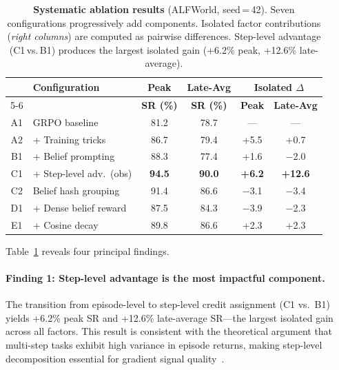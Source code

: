 \begin{table}[t]
  \centering
  \caption{%
    \textbf{Systematic ablation results} (ALFWorld, seed\,=\,42).
    Seven configurations progressively add components.
    Isolated factor contributions (\textit{right columns}) are computed as pairwise
    differences.
    Step-level advantage (C1\,vs.\,B1) produces the largest isolated gain
    (+6.2\% peak, +12.6\% late-average).
  }
  \label{tab:ablation}
  \vspace{4pt}
  \small
  \renewcommand{\arraystretch}{1.15}
  \begin{tabular}{@{}cl cc cc@{}}
    \toprule
    & \textbf{Configuration}
      & \textbf{Peak} & \textbf{Late-Avg}
      & \multicolumn{2}{c}{\textbf{Isolated $\Delta$}} \\
    \cmidrule(lr){5-6}
    & & \textbf{SR (\%)} & \textbf{SR (\%)}
      & \textbf{Peak} & \textbf{Late-Avg} \\
    \midrule
    A1 & GRPO baseline                & 81.2 & 78.7 & ---    & ---  \\
    A2 & \quad+ Training tricks        & 86.7 & 79.4 & +5.5  & +0.7 \\
    B1 & \quad+ Belief prompting       & 88.3 & 77.4 & +1.6  & $-$2.0 \\
    C1 & \quad+ Step-level adv.\ (obs) & \textbf{94.5} & \textbf{90.0} & \textbf{+6.2} & \textbf{+12.6} \\
    C2 & \quad Belief hash grouping    & 91.4 & 86.6 & $-$3.1 & $-$3.4 \\
    D1 & \quad+ Dense belief reward    & 87.5 & 84.3 & $-$3.9 & $-$2.3 \\
    E1 & \quad+ Cosine decay           & 89.8 & 86.6 & +2.3  & +2.3 \\
    \bottomrule
  \end{tabular}
\end{table}

Table~\ref{tab:ablation} reveals four principal findings.

\paragraph{Finding 1: Step-level advantage is the most impactful component.}
The transition from episode-level to step-level credit assignment (C1 vs.\ B1)
yields +6.2\% peak SR and +12.6\% late-average SR---the largest isolated gain
across all factors.
This result is consistent with the theoretical argument that multi-step tasks
exhibit high variance in episode returns, making step-level decomposition
essential for gradient signal quality~\citep{feng2025gigpo}.

